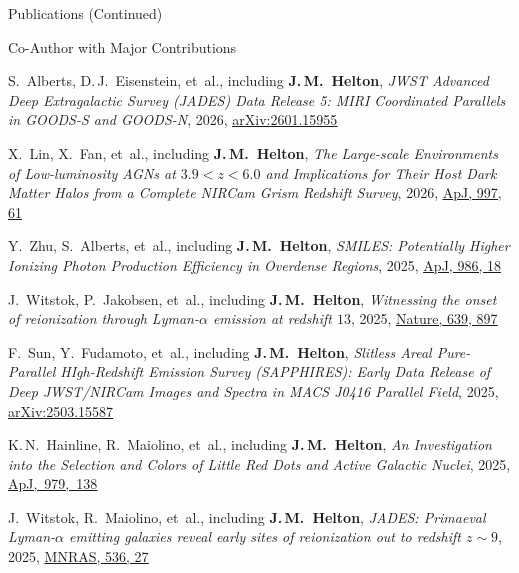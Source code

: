 \documentclass{JMH_CV}
\begin{document}
\begin{rSection}{Publications (Continued)}
\begin{rSubsection}{Co-Author with Major Contributions}{}{}{}
\begin{etaremune}
    \item S.~Alberts, D.\,J.~Eisenstein, et~al., including \textbf{J.\,M.~Helton}, \textit{JWST Advanced Deep Extragalactic Survey (JADES) Data Release 5: MIRI Coordinated Parallels in GOODS-S and GOODS-N}, 2026, \href{https://www.scixplorer.org/abs/2026arXiv260115955A/abstract}{\ul{arXiv:2601.15955}}

    \item X.~Lin, X.~Fan, et~al., including \textbf{J.\,M.~Helton}, \textit{The Large-scale Environments of Low-luminosity AGNs at $\mathit{ 3.9 < z < 6.0}$ and Implications for Their Host Dark \mbox{Matter} Halos from a Complete NIRCam Grism Redshift Survey}, 2026, \href{https://www.scixplorer.org/abs/2026ApJ...997...61L/abstract}{\ul{ApJ, 997, 61}}

    \item Y.~Zhu, S.~Alberts, et~al., including \textbf{J.\,M.~Helton}, \textit{SMILES: Potentially Higher Ionizing Photon Production Efficiency in Overdense Regions}, 2025, \href{https://www.scixplorer.org/abs/2025ApJ...986...18Z/abstract}{\ul{ApJ, 986, 18}}

    \item J.~Witstok, P.~Jakobsen, et~al., including \textbf{J.\,M.~Helton}, \textit{Witnessing the onset of reionization through Lyman-$\mathit{\alpha}$ emission at redshift $\mathit{13}$}, 2025, \href{https://www.scixplorer.org/abs/2025Natur.639..897W/abstract}{\ul{Nature, 639, 897}}

    \item F.~Sun, Y.~Fudamoto, et~al., including \textbf{J.\,M.~Helton}, \textit{Slitless Areal Pure-Parallel HIgh-Redshift Emission Survey (SAPPHIRES): Early Data Release of Deep JWST/NIRCam Images and Spectra in MACS J0416 Parallel Field}, 2025, \href{https://www.scixplorer.org/abs/2025arXiv250315587S/abstract}{\ul{arXiv:2503.15587}}

    \item K.\,N.~Hainline, R.~Maiolino, et~al., including \textbf{J.\,M.~Helton}, \textit{An Investigation into the Selection and Colors of Little Red Dots and Active Galactic Nuclei}, 2025, \href{https://www.scixplorer.org/abs/2025ApJ...979..138H/abstract}{\ul{\mbox{ApJ, 979, 138}}}

    \item J.~Witstok, R.~Maiolino, et~al., including \textbf{J.\,M.~Helton}, \textit{JADES: Primaeval \mbox{Lyman-$\mathit{\alpha}$} emitting galaxies reveal early sites of reionization out to redshift $\mathit{z \sim 9}$}, 2025, \href{https://www.scixplorer.org/abs/2025MNRAS.536...27W/abstract}{\ul{MNRAS, 536, 27}}


\end{etaremune}
\end{rSubsection}
\end{rSection}
\end{document}
